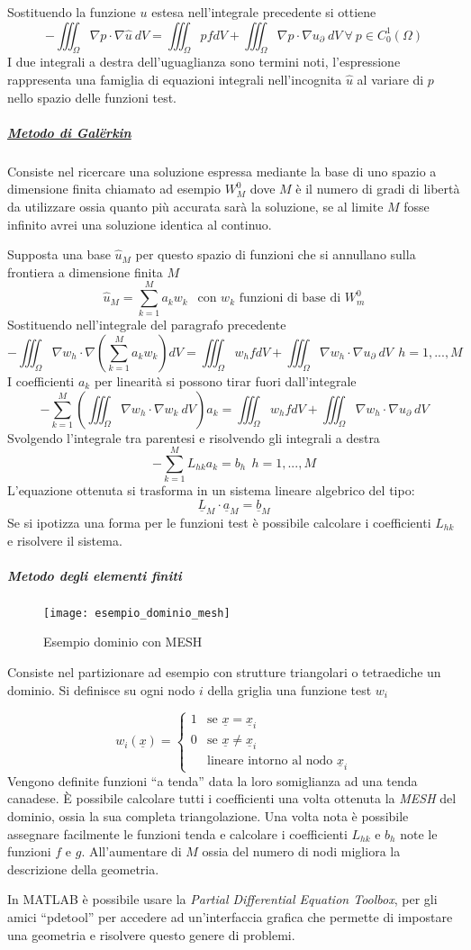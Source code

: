 Sostituendo la funzione $u$ estesa nell'integrale precedente si ottiene
$$
-\iiint_\Omega \nabla p \cdot \nabla\hat{u}\  dV = \iiint_\Omega p f dV +
\iiint_\Omega \nabla p \cdot \nabla u_\partial\ dV\ \forall\ p\in C^1_0(\Omega)
$$
I due integrali a destra dell'uguaglianza sono termini noti, l'espressione rappresenta
una famiglia di equazioni integrali nell'incognita $\hat{u}$ al variare
di $p$ nello spazio delle funzioni test.

\newpage
\subparagraph{\href{https://it.wikipedia.org/wiki/Metodo_di_Gal\%C3\%ABrkin}{Metodo di Galërkin}}
Consiste nel ricercare una soluzione espressa mediante la base di uno spazio
a dimensione finita chiamato ad esempio $W^0_M$ dove $M$ è il numero di
gradi di libertà da utilizzare ossia quanto più accurata sarà la soluzione,
se al limite $M$ fosse infinito avrei una soluzione identica al continuo.

Supposta una base $\hat{u}_M$ per questo spazio di funzioni che si 
annullano sulla frontiera a dimensione finita $M$
$$
\hat{u}_M = \sum_{k = 1}^{M} a_k w_k \ \ \text{ con } w_k \text{ funzioni di base di } W_m^0
$$
Sostituendo nell'integrale del paragrafo precedente
$$
-\iiint_\Omega \nabla w_h \cdot \nabla \left(\sum_{k=1}^{M} a_k w_k \right) dV = 
\iiint_\Omega w_h f dV + \iiint_\Omega \nabla w_h \cdot \nabla u_\partial\ dV\ \ h=1,...,M
$$
I coefficienti $a_k$ per linearità si possono tirar fuori dall'integrale
$$
-\sum_{k=1}^M \left(\iiint_\Omega \nabla w_h \cdot \nabla w_k\ dV \right) a_k = 
\iiint_\Omega w_h f dV + \iiint_\Omega \nabla w_h \cdot \nabla u_\partial\ dV
$$
Svolgendo l'integrale tra parentesi e risolvendo gli integrali a destra
$$
-\sum_{k=1}^M L_{hk} a_k = b_h\ \ h=1,...,M
$$
L'equazione ottenuta si trasforma in un sistema lineare algebrico del tipo:
$$
\underline{L}_M \cdot \underline{a}_M = \underline{b}_M
$$
Se si ipotizza una forma per le funzioni test è possibile calcolare i coefficienti
$L_{hk}$ e risolvere il sistema.

\newpage
\subparagraph{Metodo degli elementi finiti}
\begin{figure}[H]
\centering
\texttt{[image: esempio\_dominio\_mesh]}
\caption{Esempio dominio con MESH}
\end{figure}
Consiste nel partizionare ad esempio con strutture triangolari o tetraediche un dominio.
Si definisce su ogni nodo $i$ della griglia una funzione test $w_i$

$$
w_i(\underline{x}) = \begin{cases}
1 & \text{se } \underline{x} = \underline{x}_i\\
0 & \text{se } \underline{x} \neq \underline{x}_i\\
&\text{lineare intorno al nodo }\underline{x}_i
\end{cases}
$$
Vengono definite funzioni ``a tenda'' data la loro somiglianza ad una tenda canadese.
È possibile calcolare tutti i coefficienti una volta ottenuta la \textit{MESH} del
dominio, ossia la sua completa triangolazione.
Una volta nota è possibile assegnare facilmente le funzioni tenda e calcolare i
coefficienti $L_{hk}$ e $b_h$ note le funzioni $f$ e $g$.
All'aumentare di $M$ ossia del numero di nodi migliora la descrizione
della geometria.

In MATLAB è possibile usare la \textit{Partial Differential Equation Toolbox}, per 
gli amici ``pdetool'' per accedere ad un'interfaccia grafica che permette
di impostare una geometria e risolvere questo genere di problemi.
